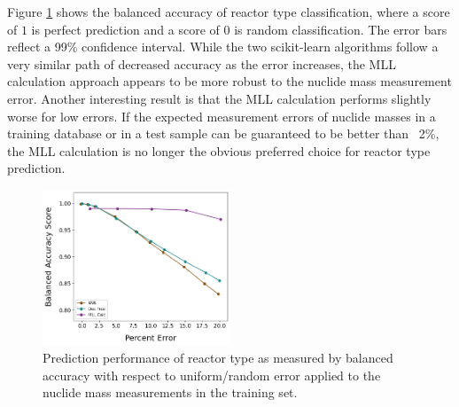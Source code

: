 Figure \ref{fig:randrxtr} shows the balanced accuracy of reactor type
classification, where a score of $1$ is perfect prediction and a score of $0$
is random classification. The error bars reflect a 99\% confidence interval.
While the two scikit-learn algorithms follow a very similar path of decreased
accuracy as the error increases, the \gls{MLL} calculation approach appears to
be more robust to the nuclide mass measurement error.  Another interesting
result is that the \gls{MLL} calculation performs slightly worse for low
errors. If the expected measurement errors of nuclide masses in a training
database or in a test sample can be guaranteed to be better than ~2\%, the
\gls{MLL} calculation is no longer the obvious preferred choice for reactor
type prediction.

\begin{figure}[!htb]
  \centering
  \includegraphics[width=0.5\textwidth]{./chapters/exp1/randerr_compare_nuc29_BalAcc_rxtr.png}
  \caption[Prediction performance of reactor type classification with increasing
           training set error]
          {Prediction performance of reactor type as measured by balanced 
           accuracy with respect to uniform/random error applied to the nuclide 
           mass measurements in the training set.}
  \label{fig:randrxtr}
\end{figure}

